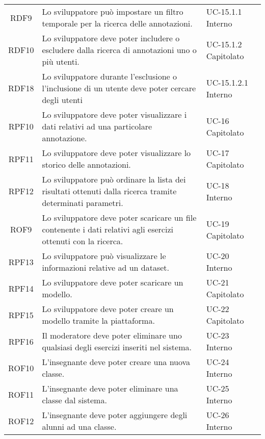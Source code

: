 \begin{tabularx}{\textwidth}{| c | p{10cm} | X |}
		RDF9 & Lo sviluppatore può impostare un filtro temporale per la ricerca delle annotazioni. & UC-15.1.1 \newline Interno\\
		RDF10 & Lo sviluppatore deve poter includere o escludere dalla ricerca di annotazioni uno o più utenti. & UC-15.1.2 \newline Capitolato\\
		RDF18 & Lo sviluppatore durante l'esclusione o l'inclusione di un utente deve poter cercare degli utenti & UC-15.1.2.1 \newline Interno\\		
		RPF10 & Lo sviluppatore deve poter visualizzare i dati relativi ad una particolare annotazione. & UC-16 \newline Capitolato\\
		RPF11 & Lo sviluppatore deve poter visualizzare lo storico delle annotazioni. & UC-17 \newline Capitolato\\
		RPF12 & Lo sviluppatore può ordinare la lista dei risultati ottenuti dalla ricerca tramite determinati parametri. & UC-18 \newline Interno\\	
		ROF9 & Lo sviluppatore deve poter scaricare un file contenente i dati relativi agli esercizi ottenuti con la ricerca. & UC-19 \newline Capitolato\\
		RPF13 & Lo sviluppatore può visualizzare le informazioni relative ad un dataset. & UC-20 \newline Interno\\
		RPF14 & Lo sviluppatore deve poter scaricare un modello. & UC-21 \newline Capitolato\\
		RPF15 & Lo sviluppatore deve poter creare un modello tramite la piattaforma. & UC-22 \newline Capitolato\\ 
		RPF16 & Il moderatore deve poter eliminare uno qualsiasi degli esercizi inseriti nel sistema. & UC-23 \newline Interno\\
		ROF10 & L'insegnante deve poter creare una nuova classe. & UC-24 \newline Interno\\
		ROF11 & L'insegnante deve poter eliminare una classe dal sistema. & UC-25 \newline Interno\\
		ROF12 & L'insegnante deve poter aggiungere degli alunni ad una classe. & UC-26 \newline Interno\\

\end{tabularx}

